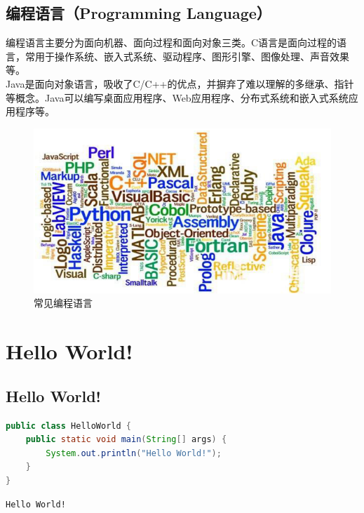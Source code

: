 \vspace{0.5cm}

\subsection{编程语言（Programming Language）}

编程语言主要分为面向机器、面向过程和面向对象三类。C语言是面向过程的语言，常用于操作系统、嵌入式系统、驱动程序、图形引擎、图像处理、声音效果等。\\

Java是面向对象语言，吸收了C/C++的优点，并摒弃了难以理解的多继承、指针等概念。Java可以编写桌面应用程序、Web应用程序、分布式系统和嵌入式系统应用程序等。

\begin{figure}[H]
	\centering
	\includegraphics[scale=0.9]{img/C1/1-1/1.png}
	\caption{常见编程语言}
\end{figure}

\newpage

\section{Hello World!}

\subsection{Hello World!}


\begin{lstlisting}[language=Java]
public class HelloWorld {
    public static void main(String[] args) {
        System.out.println("Hello World!");
    }
}
\end{lstlisting}

\begin{tcolorbox}
	\begin{verbatim}
Hello World!
	\end{verbatim}
\end{tcolorbox}

